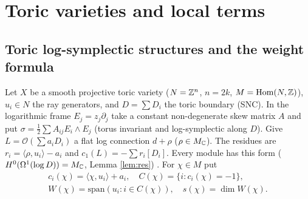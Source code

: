 \section{Toric varieties and local terms}\label{sec:toric}
\subsection{Toric log-symplectic structures and the weight formula}
Let $X$ be a smooth projective toric variety ($N=\mathbb Z^n$, $n=2k$, $M=\mathrm{Hom}(N,\mathbb Z)$), $u_i\in N$ the ray generators, and $D=\sum D_i$ the toric boundary (SNC). In the logarithmic frame $E_j=z_j\partial_j$ take a constant non-degenerate skew matrix $A$ and put $\sigma=\tfrac12\sum A_{ij}E_i\wedge E_j$ (torus invariant and log-symplectic along $D$). Give $L=\mathcal O(\sum a_iD_i)$ a flat log connection $d+\rho$ ($\rho\in M_\mathbb C$). The residues are $r_i=\langle\rho,u_i\rangle-a_i$ and $c_1(L)=-\sum r_i[D_i]$. Every module has this form ($H^0(\Omega^1(\log D))=M_\mathbb C$, Lemma \ref{lem:res}) \tP. For $\chi\in M$ put
\begin{gather*}c_i(\chi)=\langle\chi,u_i\rangle+a_i,\quad C(\chi)=\{i:c_i(\chi)=-1\},\\ W(\chi)=\mathrm{span}(u_i:i\in C(\chi)),\quad s(\chi)=\dim W(\chi).\end{gather*}

